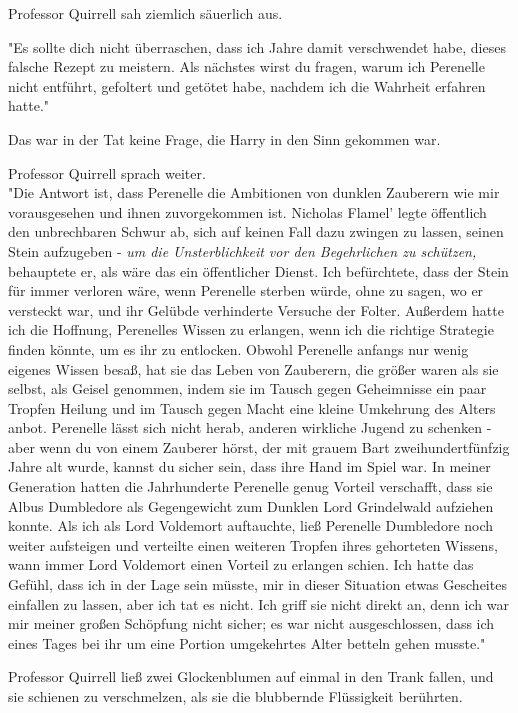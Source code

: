 {Professor Quirrell sah ziemlich säuerlich aus.

"Es sollte dich nicht überraschen, dass ich Jahre damit verschwendet habe, dieses falsche Rezept zu meistern. Als nächstes wirst du fragen, warum ich Perenelle nicht entführt, gefoltert und getötet habe, nachdem ich die Wahrheit erfahren hatte."

Das war in der Tat keine Frage, die Harry in den Sinn gekommen war.

Professor Quirrell sprach weiter.\\ "Die Antwort ist, dass Perenelle die Ambitionen von dunklen Zauberern wie mir vorausgesehen und ihnen zuvorgekommen ist. Nicholas Flamel' legte öffentlich den unbrechbaren Schwur ab, sich auf keinen Fall dazu zwingen zu lassen, seinen Stein aufzugeben - \emph{um die Unsterblichkeit vor den Begehrlichen zu schützen,} behauptete er, als wäre das ein öffentlicher Dienst. Ich befürchtete, dass der Stein für immer verloren wäre, wenn Perenelle sterben würde, ohne zu sagen, wo er versteckt war, und ihr Gelübde verhinderte Versuche der Folter. Außerdem hatte ich die Hoffnung, Perenelles Wissen zu erlangen, wenn ich die richtige Strategie finden könnte, um es ihr zu entlocken. Obwohl Perenelle anfangs nur wenig eigenes Wissen besaß, hat sie das Leben von Zauberern, die größer waren als sie selbst, als Geisel genommen, indem sie im Tausch gegen Geheimnisse ein paar Tropfen Heilung und im Tausch gegen Macht eine kleine Umkehrung des Alters anbot. Perenelle lässt sich nicht herab, anderen wirkliche Jugend zu schenken - aber wenn du von einem Zauberer hörst, der mit grauem Bart zweihundertfünfzig Jahre alt wurde, kannst du sicher sein, dass ihre Hand im Spiel war. In meiner Generation hatten die Jahrhunderte Perenelle genug Vorteil verschafft, dass sie Albus Dumbledore als Gegengewicht zum Dunklen Lord Grindelwald aufziehen konnte. Als ich als Lord Voldemort auftauchte, ließ Perenelle Dumbledore noch weiter aufsteigen und verteilte einen weiteren Tropfen ihres gehorteten Wissens, wann immer Lord Voldemort einen Vorteil zu erlangen schien. Ich hatte das Gefühl, dass ich in der Lage sein müsste, mir in dieser Situation etwas Gescheites einfallen zu lassen, aber ich tat es nicht. Ich griff sie nicht direkt an, denn ich war mir meiner großen Schöpfung nicht sicher; es war nicht ausgeschlossen, dass ich eines Tages bei ihr um eine Portion umgekehrtes Alter betteln gehen musste."

Professor Quirrell ließ zwei Glockenblumen auf einmal in den Trank fallen, und sie schienen zu verschmelzen, als sie die blubbernde Flüssigkeit berührten.

}
